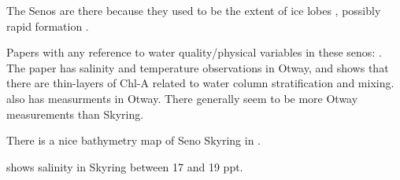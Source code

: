 \documentclass[11pt, oneside]{article}   	%
\begin{document}
The Senos are there because they used to be the extent of ice lobes \citep{darvill17}, possibly rapid formation \citep{lovell12}.

Papers with any reference to water quality/physical variables in these senos: \citep{mansilla13, rodriguez18, valdenegro03, rios16, mansilla13_AIP}. The \citet{rios16} paper has salinity and temperature observations in Otway, and shows that there are thin-layers of Chl-A related to water column stratification and mixing. \citep{cuevas19} also has measurments in Otway. There generally seem to be more Otway measurements than Skyring. 

There is a nice bathymetry map of Seno Skyring in \citep{breuer13}.

\citep{kilian07} shows salinity in Skyring between 17 and 19 ppt. 

{}

\end{document}
